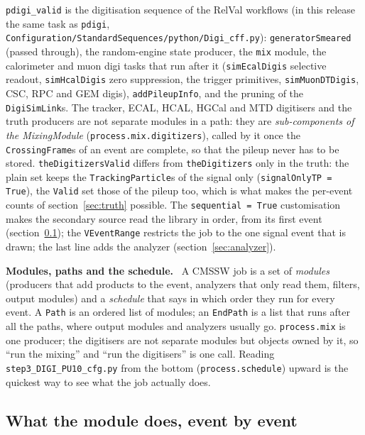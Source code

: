 \documentclass[11pt,a4paper]{article}
\newcommand{\code}[1]{\texttt{#1}}
\newenvironment{plainwords}[1][In plain words]{%
  \par\medskip\noindent\setlength{\fboxsep}{6pt}\setlength{\fboxrule}{0.6pt}%
  \begin{lrbox}{\plainbox}\begin{minipage}{\dimexpr\textwidth-2\fboxsep-2\fboxrule\relax}\small
  \textbf{\textcolor{plainrule}{#1.}}\ \ignorespaces}{%
  \end{minipage}\end{lrbox}\noindent\fcolorbox{plainrule}{plainbg}{\usebox{\plainbox}}\par\medskip}
\begin{document}
\code{pdigi\_valid} is the digitisation sequence of the RelVal workflows (in this release the same task as
\code{pdigi}, \code{Configuration/StandardSequences/python/Digi\_cff.py}): \code{generatorSmeared} (passed
through), the random-engine state producer, the \code{mix} module, the calorimeter and muon digi tasks that
run after it (\code{simEcalDigis} selective readout, \code{simHcalDigis} zero suppression, the trigger
primitives, \code{simMuonDTDigis}, CSC, RPC and GEM digis), \code{addPileupInfo}, and the pruning of the
\code{DigiSimLink}s. The tracker, ECAL, HCAL, HGCal and MTD digitisers and the truth producers are not
separate modules in a path: they are \emph{sub-components of the MixingModule}
(\code{process.mix.digitizers}), called by it once the \code{CrossingFrame}s of an event are complete, so that
the pileup never has to be stored. \code{theDigitizersValid} differs from \code{theDigitizers} only in the
truth: the plain set keeps the \code{TrackingParticle}s of the signal only (\code{signalOnlyTP = True}), the
\code{Valid} set those of the pileup too, which is what makes the per-event counts of
section~\ref{sec:truth} possible. The \code{sequential = True} customisation makes the secondary source read
the library in order, from its first event (section~\ref{sec:drawing}); the \code{VEventRange} restricts the job
to the one signal event that is drawn; the last line adds the analyzer (section~\ref{sec:analyzer}).

\begin{plainwords}[Modules, paths and the schedule]
A CMSSW job is a set of \emph{modules} (producers that add products to the event, analyzers that only read
them, filters, output modules) and a \emph{schedule} that says in which order they run for every event. A
\code{Path} is an ordered list of modules; an \code{EndPath} is a list that runs after all the paths, where
output modules and analyzers usually go. \code{process.mix} is one producer; the digitisers are not separate
modules but objects owned by it, so ``run the mixing'' and ``run the digitisers'' is one call. Reading
\code{step3\_DIGI\_PU10\_cfg.py} from the bottom (\code{process.schedule}) upward is the quickest way to see
what the job actually does.
\end{plainwords}

\subsection{What the module does, event by event}
\label{sec:drawing}
\end{document}

